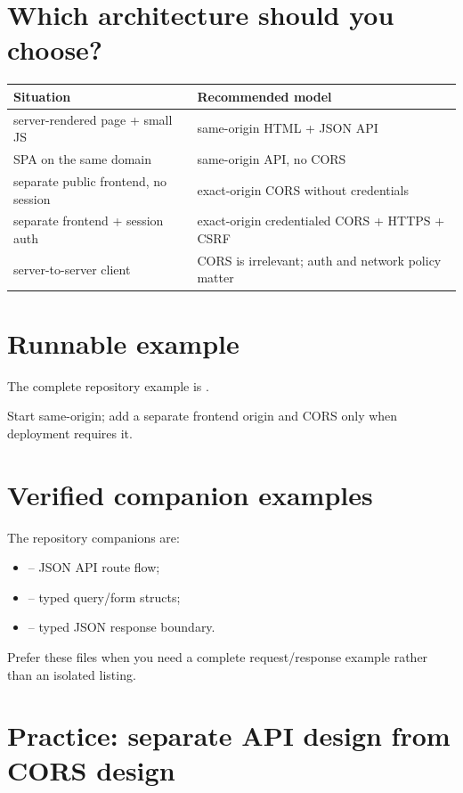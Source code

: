 \section{Which architecture should you choose?}

\begin{center}
\begin{tabularx}{\textwidth}{@{}L{0.27\textwidth}Y@{}}
\toprule
\textbf{Situation} & \textbf{Recommended model} \\
\midrule
server-rendered page + small JS & same-origin HTML + JSON API \\
SPA on the same domain & same-origin API, no CORS \\
separate public frontend, no session & exact-origin CORS without credentials \\
separate frontend + session auth & exact-origin credentialed CORS + HTTPS + CSRF \\
server-to-server client & CORS is irrelevant; auth and network policy matter \\
\bottomrule
\end{tabularx}
\end{center}

\section{Runnable example}

The complete repository example is .

Start same-origin; add a separate frontend origin and CORS only when deployment requires it.

\section{Verified companion examples}
The repository companions are:
\begin{itemize}
  \item {} -- JSON API route flow;
  \item {} -- typed query/form structs;
  \item {} -- typed JSON response boundary.
\end{itemize}
Prefer these files when you need a complete request/response example rather than an isolated listing.

\section{Practice: separate API design from CORS design}
